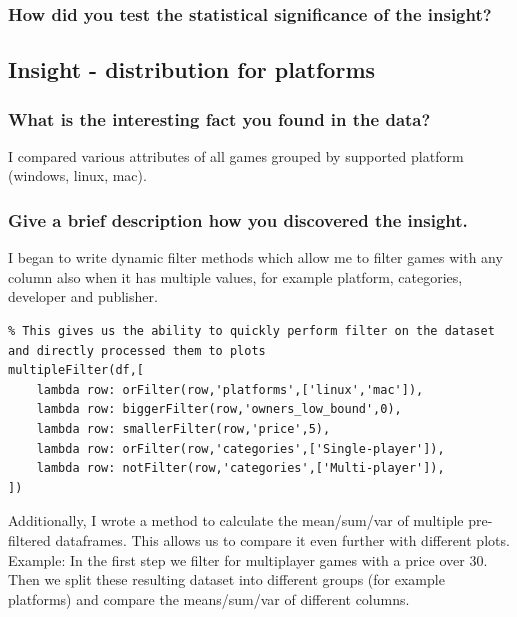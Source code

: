 \documentclass[11pt]{article}
\begin{document}
\subsubsection{How did you test the statistical significance of the insight?}

\subsection{Insight - distribution for platforms}

\subsubsection{What is the interesting fact you found in the data?}

I compared various attributes of all games grouped by supported platform (windows, linux, mac). 

\subsubsection{Give a brief description how you discovered the
insight.}

I began to write dynamic filter methods which allow me to filter games with any column also when it has multiple values, for example platform, categories, developer and publisher. 

\begin{minipage}{\linewidth}
\begin{lstlisting}
% This gives us the ability to quickly perform filter on the dataset 
and directly processed them to plots
multipleFilter(df,[
    lambda row: orFilter(row,'platforms',['linux','mac']),
    lambda row: biggerFilter(row,'owners_low_bound',0),
    lambda row: smallerFilter(row,'price',5),
    lambda row: orFilter(row,'categories',['Single-player']),
    lambda row: notFilter(row,'categories',['Multi-player']),
])
\end{lstlisting}
\end{minipage}

Additionally, I wrote a method to calculate the mean/sum/var of multiple pre-filtered dataframes. This allows us to compare it even further with different plots. Example: In the first step we filter for multiplayer games with a price over 30. Then we split these resulting dataset into different groups (for example platforms) and compare the means/sum/var of different columns.\\
\end{document}
